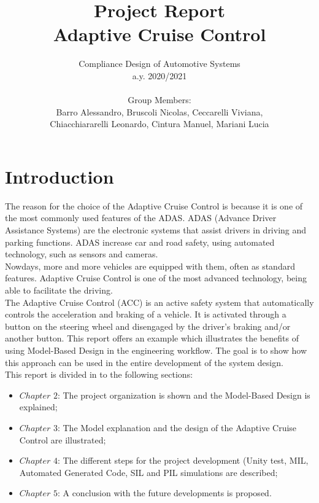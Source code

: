 \documentclass[12pt,a4paper]{report}
\begin{document}
	
	\author{Compliance Design of Automotive Systems \\
		a.y. 2020/2021\\\\
		Group Members:\\
		Barro Alessandro, Bruscoli Nicolas, Ceccarelli Viviana, \\
		Chiacchiararelli Leonardo, Cintura Manuel, Mariani Lucia\\
	}
	\title{Project Report\\
		Adaptive Cruise Control
	}
	\maketitle
	
\tableofcontents
\listoffigures


\chapter{Introduction}
The reason for the choice of the Adaptive Cruise Control is because it is one of the most commonly used features of the ADAS. ADAS (Advance Driver Assistance Systems) are the electronic systems that assist drivers in driving and parking functions. ADAS increase car and road safety, using automated technology, such as sensors and cameras.\\ Nowdays, more and more vehicles are equipped with them, often as standard features. Adaptive Cruise Control is one of the most advanced technology, being able to facilitate the driving.\\
The Adaptive Cruise Control (ACC) is an active safety system that automatically controls the acceleration and braking of a vehicle. It is activated through a button on the steering wheel and disengaged by the driver’s braking and/or another button.
This report offers an example which illustrates the benefits of using Model-Based Design in the engineering workflow.
The goal is to show how this approach can be used in the entire development of the system design.\\
This report is divided in to the following sections:
\begin{itemize}
	\item $Chapter$ $2$: The project organization is shown and the Model-Based Design is explained;
	\item $Chapter$ $3$: The Model explanation and the design of the Adaptive Cruise Control are illustrated;
	\item $Chapter$ $4$: The different steps for the project development (Unity test, MIL, Automated Generated Code, SIL and PIL simulations are described;
	\item $Chapter$ $5$: A conclusion with the future developments is proposed.
\end{itemize}
\end{document}
